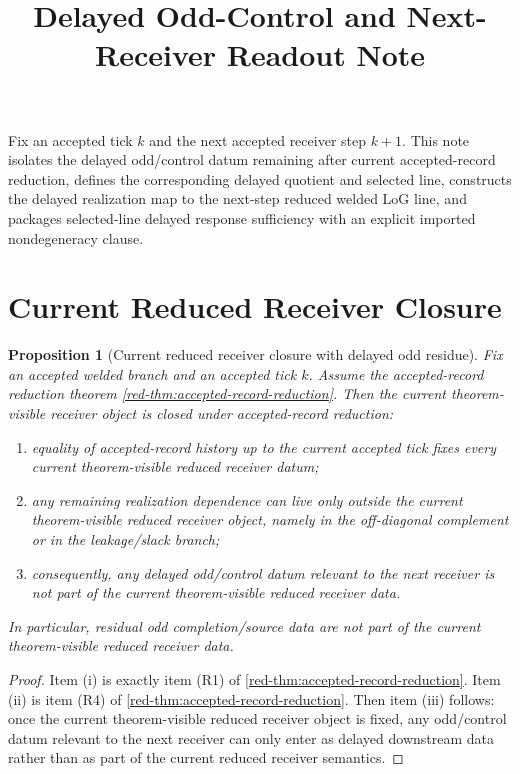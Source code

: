 \documentclass[11pt]{article}
\title{Delayed Odd-Control and Next-Receiver Readout Note}
\author{}
\date{}
\theoremstyle{definition}
\theoremstyle{plain}
\newtheorem{proposition}[definition]{Proposition}
\theoremstyle{remark}
\begin{document}
\maketitle

Fix an accepted tick \(k\) and the next accepted receiver step \(k+1\).
This note isolates the delayed odd/control datum remaining after current accepted-record reduction,
defines the corresponding delayed quotient and selected line, constructs the delayed realization map
to the next-step reduced welded LoG line, and packages selected-line delayed response sufficiency
with an explicit imported nondegeneracy clause.

\section{Current Reduced Receiver Closure}

\begin{proposition}[Current reduced receiver closure with delayed odd residue]
\label{prop:delay-current-closure}
Fix an accepted welded branch and an accepted tick \(k\).
Assume the accepted-record reduction theorem \cref*{red-thm:accepted-record-reduction}.
Then the current theorem-visible receiver object is closed under accepted-record reduction:
\begin{enumerate}[leftmargin=2em,label=(\roman*)]
\item equality of accepted-record history up to the current accepted tick fixes every current
  theorem-visible reduced receiver datum;
\item any remaining realization dependence can live only outside the current theorem-visible reduced
  receiver object, namely in the off-diagonal complement or in the leakage/slack branch;
\item consequently, any delayed odd/control datum relevant to the next receiver is not part of the
  current theorem-visible reduced receiver data.
\end{enumerate}
In particular, residual odd completion/source data are \emph{not} part of the current
theorem-visible reduced receiver data.
\end{proposition}

\begin{proof}
Item \textnormal{(i)} is exactly item \textnormal{(R1)} of
\cref*{red-thm:accepted-record-reduction}.
Item \textnormal{(ii)} is item \textnormal{(R4)} of \cref*{red-thm:accepted-record-reduction}.
Then item \textnormal{(iii)} follows: once the current theorem-visible reduced receiver object is
fixed, any odd/control datum relevant to the next receiver can only enter as delayed downstream data
rather than as part of the current reduced receiver semantics.
\end{proof}
\end{document}
